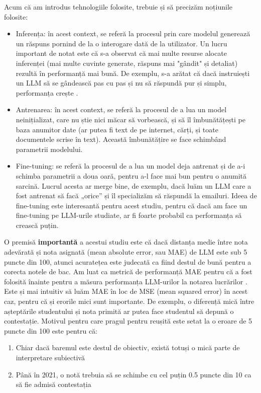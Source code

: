 Acum că am introdus tehnologiile folosite, trebuie și să precizăm noțiunile folosite:
\begin{itemize}
\item Inferența: în acest context, se referă la procesul prin care modelul generează un răspuns pornind de la o interogare dată de la utilizator.
Un lucru important de notat este că s-a observat că mai multe resurse alocate inferenței (mai multe cuvinte generate,
răspuns mai "gândit" și detaliat)
rezultă în performanță mai bună. De exemplu, s-a arătat că dacă instruiești un LLM să se gândească pas cu pas și nu să răspundă pur și simplu, performanța crește \cite{cot}.

\item Antrenarea: în acest context, se referă la procesul de a lua un model neinițializat, care nu știe nici măcar să vorbească, și să
îl îmbunătățești pe baza anumitor date (ar putea fi text de pe internet, cărți, și toate documentele scrise în text). Această îmbunătățire se face schimbând parametrii modelului.

\item Fine-tuning: se referă la procesul de a lua un model deja antrenat și de a-i schimba parametrii a doua oară, pentru a-l face mai bun
pentru o anumită sarcină. Lucrul acesta ar merge bine, de exemplu, dacă luăm un LLM care a fost antrenat să facă „orice” și îl specializăm să
răspundă la emailuri. Ideea de fine-tuning este interesantă pentru acest studiu, pentru că dacă am face un fine-tuning pe LLM-urile studiate,
ar fi foarte probabil ca performanța să crească puțin.
\end{itemize}

O premisă \textbf{importantă} a acestui studiu este că dacă distanța medie între nota adevărată și nota asignată (mean absolute error, sau MAE) de LLM este sub 5 puncte din 100,
atunci acuratețea este judecată ca fiind destul de bună pentru a corecta notele de bac.
Am luat ca metrică de performanță MAE pentru că a fost folosită înainte pentru a măsura performanța LLM-urilor la notarea lucrărilor \cite{golchin}.
Este și mai intuitiv să luăm MAE în loc de MSE (mean squared error) în acest caz, pentru că și erorile mici sunt importante. De exemplu, o diferență
mică între așteptările studentului și nota primită ar
putea face studentul să depună o contestație. Motivul pentru care pragul pentru reușită este setat la o eroare de 5 puncte din 100 este pentru că:
\begin{enumerate}
\item Chiar dacă baremul este destul de obiectiv, există totuși o mică parte de interpretare subiectivă
\item Până în 2021, o notă trebuia să se schimbe cu cel puțin 0.5 puncte din 10 ca să fie admisă contestația
\end{enumerate}


